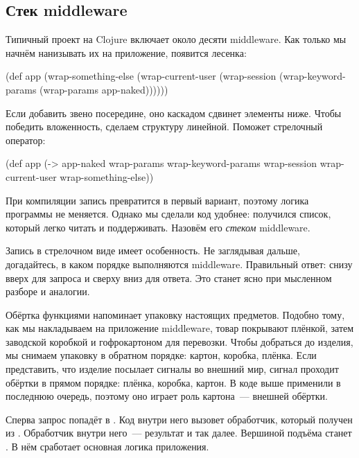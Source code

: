\subsection{Стек middleware}

Типичный проект на Clojure включает около десяти middleware. Как только мы
начнём нанизывать их на приложение, появится лесенка:

\begin{clojure}
(def app
  (wrap-something-else
    (wrap-current-user
      (wrap-session
        (wrap-keyword-params
          (wrap-params app-naked))))))
\end{clojure}


Если добавить звено посередине, оно каскадом сдвинет элементы ниже. Чтобы
победить вложенность, сделаем структуру линейной. Поможет стрелочный оператор:


\begin{clojure/lines}
(def app
  (-> app-naked
      wrap-params
      wrap-keyword-params
      wrap-session
      wrap-current-user
      wrap-something-else))
\end{clojure/lines}


При компиляции запись превратится в первый вариант, поэтому логика программы не
меняется. Однако мы сделали код удобнее: получился список, который легко читать
и поддерживать. Назовём его \emph{стеком} middleware.

Запись в стрелочном виде имеет особенность. Не заглядывая дальше, догадайтесь, в
каком порядке выполняются middleware. Правильный ответ: снизу вверх для запроса
и сверху вниз для ответа. Это станет ясно при мысленном разборе и аналогии.


Обёртка функциями напоминает упаковку настоящих предметов. Подобно тому, как мы
накладываем на приложение middleware, товар покрывают плёнкой, затем заводской
коробкой и гофрокартоном для перевозки. Чтобы добраться до изделия, мы снимаем
упаковку в обратном порядке: картон, коробка, плёнка. Если представить, что
изделие посылает сигналы во внешний мир, сигнал проходит обёртки в прямом
порядке: плёнка, коробка, картон. В коде выше 
применили в последнюю очередь, поэтому оно играет роль картона~--- внешней
обёртки.

Сперва запрос попадёт в . Код внутри него
вызовет обработчик, который получен из . Обработчик
внутри него~--- результат  и так далее. Вершиной подъёма
станет . В нём сработает основная логика приложения.

